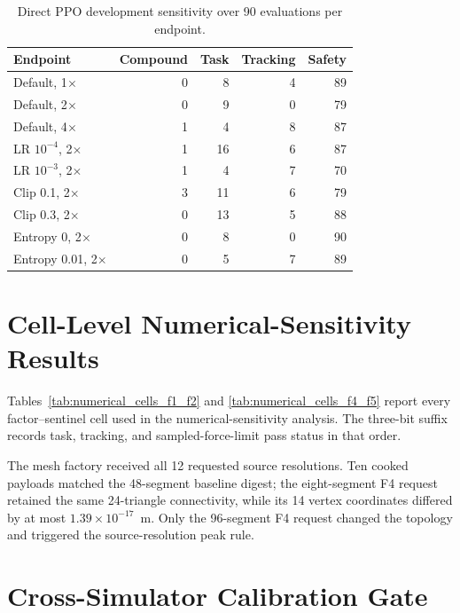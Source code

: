 \begin{table}[t]
\centering
\caption{Direct PPO development sensitivity over 90 evaluations per endpoint.}
\label{tab:ppo_dev_sensitivity}
\small
\begin{tabular}{lrrrr}
\toprule
Endpoint & Compound & Task & Tracking & Safety \\
\midrule
Default, 1$\times$ & 0 & 8 & 4 & 89 \\
Default, 2$\times$ & 0 & 9 & 0 & 79 \\
Default, 4$\times$ & 1 & 4 & 8 & 87 \\
LR $10^{-4}$, 2$\times$ & 1 & 16 & 6 & 87 \\
LR $10^{-3}$, 2$\times$ & 1 & 4 & 7 & 70 \\
Clip 0.1, 2$\times$ & 3 & 11 & 6 & 79 \\
Clip 0.3, 2$\times$ & 0 & 13 & 5 & 88 \\
Entropy 0, 2$\times$ & 0 & 8 & 0 & 90 \\
Entropy 0.01, 2$\times$ & 0 & 5 & 7 & 89 \\
\bottomrule
\end{tabular}
\end{table}

\section{Cell-Level Numerical-Sensitivity Results}
\label{app:numerical_cells}

Tables~\ref{tab:numerical_cells_f1_f2} and
\ref{tab:numerical_cells_f4_f5} report every factor--sentinel cell used in the
numerical-sensitivity analysis. The three-bit suffix records task, tracking,
and sampled-force-limit pass status in that order.

The mesh factory received all 12 requested source resolutions. Ten cooked
payloads matched the 48-segment baseline digest; the eight-segment F4 request
retained the same 24-triangle connectivity, while its 14 vertex coordinates
differed by at most $1.39\times10^{-17}$~m. Only the 96-segment F4 request
changed the topology and triggered the source-resolution peak rule.

\FloatBarrier

\FloatBarrier

\section{Cross-Simulator Calibration Gate}
\label{app:crosssim_gate}

